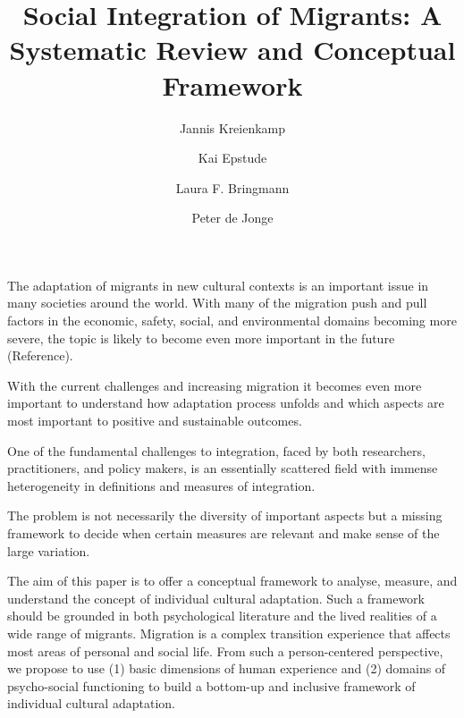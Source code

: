 \documentclass[man, 12pt, a4paper]{apa7}
\title{Social Integration of Migrants: A Systematic Review and Conceptual Framework}
\author[1]{Jannis Kreienkamp}
\author[1]{Kai Epstude}
\author[1,2]{Laura F. Bringmann}
\author[1,2]{Peter de Jonge}
\affiliation{\hfill}
\affil[1]{University of Groningen, Department of Psychology}
\affil[2]{Some other affiliation}
\begin{document}
\maketitle

The adaptation of migrants in new cultural contexts is an important issue in many societies around the world. With many of the migration push and pull factors in the economic, safety, social, and environmental domains becoming more severe, the topic is likely to become even more important in the future (Reference).

With the current challenges and increasing migration it becomes even more important to understand how adaptation process unfolds and which aspects are most important to positive and sustainable outcomes.

One of the fundamental challenges to integration, faced by both researchers, practitioners, and policy makers, is an essentially scattered field with immense heterogeneity in definitions and measures of integration.

The problem is not necessarily the diversity of important aspects but a missing framework to decide when certain measures are relevant and make sense of the large variation.

The aim of this paper is to offer a conceptual framework to analyse, measure, and understand the concept of individual cultural adaptation. Such a framework should be grounded in both psychological literature and the lived realities of a wide range of migrants.
Migration is a complex transition experience that affects most areas of personal and social life. From such a person-centered perspective, we propose to use (1) basic dimensions of human experience and (2) domains of psycho-social functioning to build a bottom-up and inclusive framework of individual cultural adaptation.
\end{document}
